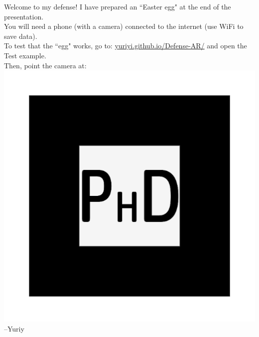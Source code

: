 \documentclass[a4paper,12pt]{letter}
\begin{document}
\Large\thispagestyle{empty}
\centering
Welcome to my defense!
\vskip1cm
I have prepared an ``Easter egg" at the end of the presentation.\\[1em]
You will need a phone (with a camera) connected to the internet (use WiFi to save data).\\[1em]
To test that the ``egg" works, go to:
\url{yuriyi.github.io/Defense-AR/} and open the Test example.\\[1em]
Then, point the camera at:
\includegraphics[width=\textwidth]{../source/images/phd}
\flushright --Yuriy
\end{document}
